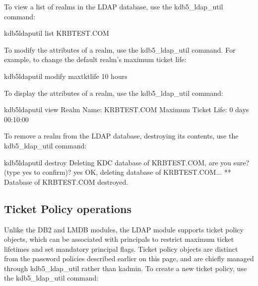 \documentclass[letterpaper,10pt,english]{sphinxmanual}
\begin{document}
\sphinxAtStartPar
To view a list of realms in the LDAP database, use the kdb5\_ldap\_util
 command:

\begin{sphinxVerbatim}[commandchars=\\\{\}]
\PYGZdl{} kdb5\PYGZus{}ldap\PYGZus{}util list
KRBTEST.COM
\end{sphinxVerbatim}

\sphinxAtStartPar
To modify the attributes of a realm, use the kdb5\_ldap\_util 
command.  For example, to change the default realm’s maximum ticket
life:

\begin{sphinxVerbatim}[commandchars=\\\{\}]
\PYGZdl{} kdb5\PYGZus{}ldap\PYGZus{}util modify \PYGZhy{}maxtktlife \PYGZdq{}10 hours\PYGZdq{}
\end{sphinxVerbatim}

\sphinxAtStartPar
To display the attributes of a realm, use the kdb5\_ldap\_util 
command:

\begin{sphinxVerbatim}[commandchars=\\\{\}]
\PYGZdl{} kdb5\PYGZus{}ldap\PYGZus{}util view
               Realm Name: KRBTEST.COM
      Maximum Ticket Life: 0 days 00:10:00
\end{sphinxVerbatim}

\sphinxAtStartPar
To remove a realm from the LDAP database, destroying its contents, use
the kdb5\_ldap\_util  command:

\begin{sphinxVerbatim}[commandchars=\\\{\}]
\PYGZdl{} kdb5\PYGZus{}ldap\PYGZus{}util destroy
Deleting KDC database of \PYGZsq{}KRBTEST.COM\PYGZsq{}, are you sure?
(type \PYGZsq{}yes\PYGZsq{} to confirm)? yes
OK, deleting database of \PYGZsq{}KRBTEST.COM\PYGZsq{}...
** Database of \PYGZsq{}KRBTEST.COM\PYGZsq{} destroyed.
\end{sphinxVerbatim}


\subsection{Ticket Policy operations}
\label{\detokenize{admin/database:ticket-policy-operations}}
\sphinxAtStartPar
Unlike the DB2 and LMDB modules, the LDAP module supports ticket
policy objects, which can be associated with principals to restrict
maximum ticket lifetimes and set mandatory principal flags.  Ticket
policy objects are distinct from the password policies described
earlier on this page, and are chiefly managed through kdb5\_ldap\_util
rather than kadmin.  To create a new ticket policy, use the
kdb5\_ldap\_util  command:
\end{document}
